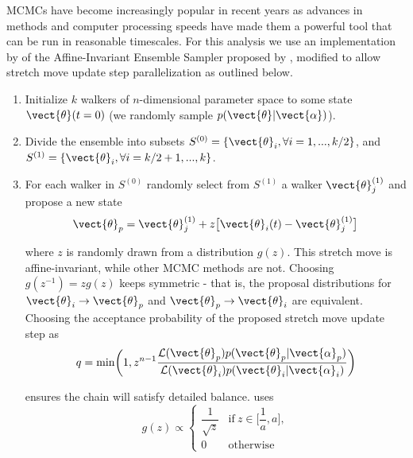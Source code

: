 MCMCs have become increasingly popular in recent years as advances in methods and computer processing speeds have made them
a powerful tool that can be run in reasonable timescales.  For this analysis we use an implementation by  of
the Affine-Invariant Ensemble Sampler proposed by , modified to allow stretch move update step parallelization as
outlined below.

\begin{enumerate}
\item Initialize $k$ walkers of $n$-dimensional parameter space to some state $\vect{\theta}(t = 0)$ (we randomly sample
$p(\vect{\theta}|\vect{\alpha})$).

\item \label{itm:divide} Divide the ensemble into subsets $S^{(0)} = \{\vect{\theta}_i, \forall i = 1, . . ., k/2\}$, and
$S^{(1)} = \{\vect{\theta}_i, \forall i = k/2 + 1, . . ., k\}$.

\item \label{itm:newstate} For each walker in $S^{(0)}$ randomly select from $S^{(1)}$ a walker $\vect{\theta}_j^{(1)}$ and propose a new
state
\begin{equation}
\vect{\theta}_p = \vect{\theta}_j^{(1)} + z \big[ \vect{\theta}_i(t) - \vect{\theta}_j^{(1)} \big]
\label{eq:er_nr_calibrations_parameter_determ_mcmc_walker_update}
\end{equation}

\noindent where $z$ is randomly drawn from a distribution $g(z)$. This stretch move is affine-invariant, while other MCMC
methods are not.  Choosing
$g(z^{-1}) = z g(z)$ keeps  symmetric - that is, the proposal
distributions for $\vect{\theta}_i \rightarrow \vect{\theta}_p$ and $\vect{\theta}_p \rightarrow \vect{\theta}_i$ are
equivalent.  Choosing the
acceptance probability of the proposed stretch move update step as
\begin{equation}
q = \mathrm{min} \bigg( 1, z^{n - 1} \frac{\mathcal{L}(\vect{\theta}_p)p(\vect{\theta}_p|\vect{\alpha}_p)}
{\mathcal{L}(\vect{\theta}_i)p(\vect{\theta}_i|\vect{\alpha}_i)} \bigg)
\label{eq:er_nr_calibrations_parameter_determ_mcmc_prob}
\end{equation}

\noindent ensures the chain will satisfy detailed balance.   uses
\begin{equation}
g(z) \propto
\begin{cases}
\dfrac{1}{\sqrt{z}} & \mathrm{if}\ z \in \bigg[ \dfrac{1}{a}, a \bigg], \\
0 & \mathrm{otherwise}
\end{cases}
\end{equation}


\end{enumerate}
